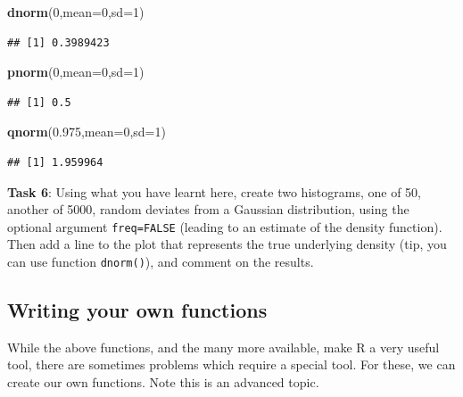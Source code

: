 \documentclass[]{book}
\newenvironment{Shaded}{\begin{snugshade}}{\end{snugshade}}
\newcommand{\KeywordTok}[1]{\textcolor[rgb]{0.13,0.29,0.53}{\textbf{#1}}}
\newcommand{\DataTypeTok}[1]{\textcolor[rgb]{0.13,0.29,0.53}{#1}}
\newcommand{\DecValTok}[1]{\textcolor[rgb]{0.00,0.00,0.81}{#1}}
\newcommand{\FloatTok}[1]{\textcolor[rgb]{0.00,0.00,0.81}{#1}}
\newcommand{\NormalTok}[1]{#1}
\theoremstyle{definition}
\theoremstyle{definition}
\theoremstyle{remark}
\begin{document}
\begin{Shaded}
\begin{Highlighting}[]
\KeywordTok{dnorm}\NormalTok{(}\DecValTok{0}\NormalTok{,}\DataTypeTok{mean=}\DecValTok{0}\NormalTok{,}\DataTypeTok{sd=}\DecValTok{1}\NormalTok{)}
\end{Highlighting}
\end{Shaded}

\begin{verbatim}
## [1] 0.3989423
\end{verbatim}

\begin{Shaded}
\begin{Highlighting}[]
\KeywordTok{pnorm}\NormalTok{(}\DecValTok{0}\NormalTok{,}\DataTypeTok{mean=}\DecValTok{0}\NormalTok{,}\DataTypeTok{sd=}\DecValTok{1}\NormalTok{)}
\end{Highlighting}
\end{Shaded}

\begin{verbatim}
## [1] 0.5
\end{verbatim}

\begin{Shaded}
\begin{Highlighting}[]
\KeywordTok{qnorm}\NormalTok{(}\FloatTok{0.975}\NormalTok{,}\DataTypeTok{mean=}\DecValTok{0}\NormalTok{,}\DataTypeTok{sd=}\DecValTok{1}\NormalTok{)}
\end{Highlighting}
\end{Shaded}

\begin{verbatim}
## [1] 1.959964
\end{verbatim}

\textbf{Task 6}: Using what you have learnt here, create two histograms,
one of 50, another of 5000, random deviates from a Gaussian
distribution, using the optional argument \texttt{freq=FALSE} (leading
to an estimate of the density function). Then add a line to the plot
that represents the true underlying density (tip, you can use function
\texttt{dnorm()}), and comment on the results.

\subsection{Writing your own
functions}\label{writing-your-own-functions}

While the above functions, and the many more available, make R a very
useful tool, there are sometimes problems which require a special tool.
For these, we can create our own functions. Note this is an advanced
topic.
\end{document}
